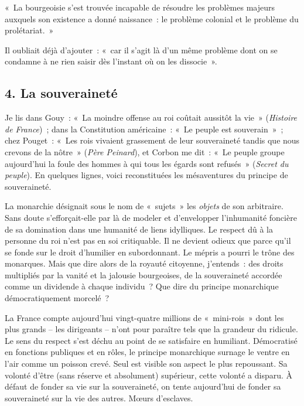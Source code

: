 \documentclass[french,twoside]{book} %
\newenvironment{quoteblock}%
  {\begin{quoting}}
  {\end{quoting}}
\newenvironment{quotebar}{%
    \def\FrameCommand{{\color{rubric!10!}\vrule width 0.5em} \hspace{0.9em}}%
    \def\OuterFrameSep{\itemsep} %
    \MakeFramed {\advance\hsize-\width \FrameRestore}
  }%
  {%
    \endMakeFramed
  }
\renewenvironment{quoteblock}%
  {%
    \savenotes
    \setstretch{0.9}
    \normalfont
    \begin{quotebar}
  }
  {%
    \end{quotebar}
    \spewnotes
  }
\begin{document}
\begin{quoteblock}
\noindent « La bourgeoisie s’est trouvée incapable de résoudre les problèmes majeurs auxquels son existence a donné naissance : le problème colonial et le problème du prolétariat. »\end{quoteblock}

\noindent Il oubliait déjà d’ajouter : « car il s’agit là d’un même problème dont on se condamne à ne rien saisir dès l’instant où on les dissocie ».
\subsection[{4. La souveraineté}]{\textsc{4.} La souveraineté}
\noindent Je lis dans Gouy : « La moindre offense au roi coûtait aussitôt la vie » (\emph{Histoire de France}) ; dans la Constitution américaine : « Le peuple est souverain » ; chez Pouget : « Les rois vivaient grassement de leur souveraineté tandis que nous crevons de la nôtre » (\emph{Père Peinard}), et Corbon me dit : « Le peuple groupe aujourd’hui la foule des hommes à qui tous les égards sont refusés » (\emph{Secret du peuple}). En quelques lignes, voici reconstituées les mésaventures du principe de souveraineté.\par
La monarchie désignait sous le nom de « sujets » les \emph{objets} de son arbitraire. Sans doute s’efforçait-elle par là de modeler et d’envelopper l’inhumanité foncière de sa domination dans une humanité de liens idylliques. Le respect dû à la personne du roi n’est pas en soi critiquable. Il ne devient odieux que parce qu’il se fonde sur le droit d’humilier en subordonnant. Le mépris a pourri le trône des monarques. Mais que dire alors de la royauté citoyenne, j’entends : des droits multipliés par la vanité et la jalousie bourgeoises, de la souveraineté accordée comme un dividende à chaque individu ? Que dire du principe monarchique démocratiquement morcelé ?\par
La France compte aujourd’hui vingt-quatre millions de « mini-rois » dont les plus grands – les dirigeants – n’ont pour paraître tels que la grandeur du ridicule. Le sens du respect s’est déchu au point de se satisfaire en humiliant. Démocratisé en fonctions publiques et en rôles, le principe monarchique surnage le ventre en l’air comme un poisson crevé. Seul est visible son aspect le plus repoussant. Sa volonté d’être (sans réserve et absolument) supérieur, cette volonté a disparu. À défaut de fonder sa vie sur la souveraineté, on tente aujourd’hui de fonder sa souveraineté sur la vie des autres. Mœurs d’esclaves.
\end{document}
